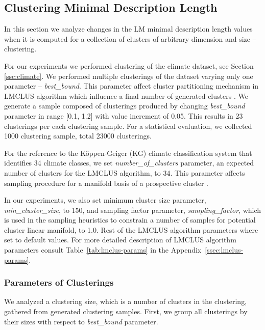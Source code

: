 \subsection{Clustering Minimal Description Length}
\label{ssc:mdl-clust}

In this section we analyze changes in the LM minimal description length values
when it is computed for a collection of clusters of arbitrary dimension and size
-- clustering.

For our experiments we performed clustering of the climate dataset,
see Section \ref{ssc:climate}. We performed multiple clusterings of the dataset
varying only one parameter -- \emph{best\_bound}. This parameter affect
cluster partitioning mechanism in LMCLUS algorithm which influence a final
number of generated clusters \cite{Haralick:2007rt}. We generate a sample
composed of clusterings produced by changing \emph{best\_bound} parameter in
range [0.1, 1.2] with value increment of 0.05. This results in 23 clusterings
per each clustering sample. For a statistical evaluation, we collected 1000
clustering sample, total 23000 clusterings.

For the reference to the K{\"o}ppen-Geiger (KG) climate classification system that
identifies 34 climate classes, we set \emph{number\_of\_clusters} parameter,
an expected number of clusters for the LMCLUS algorithm, to 34.
This parameter affects sampling procedure for a manifold basis of a prospective
cluster \cite{Haralick:2007rt}.

In our experiments, we also set minimum cluster size parameter,
\emph{min\_cluster\_size}, to 150, and sampling factor parameter,
\emph{sampling\_factor}, which is used in the sampling heuristics to constrain
a number of samples for potential cluster linear manifold, to 1.0.
Rest of the LMCLUS algorithm parameters where set to default values.
For more detailed description of LMCLUS algorithm parameters consult
Table~\ref{tab:lmclus-params} in the Appendix~\ref{ssec:lmclus-params}.




\subsubsection{Parameters of Clusterings}
\label{sssc:clust-params}

We analyzed a clustering size, which is a number of clusters in the clustering,
gathered from generated clustering samples. First, we group all clusterings by
their sizes with respect to \emph{best\_bound} parameter.

